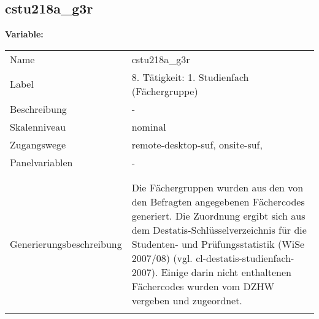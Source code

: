 	
	
	\subsection{cstu218a\_g3r}
	\label{subSection:cstu218a_g3r}

	\noindent\textbf{Variable:}\\
		\begin{tabular}{lL{11.3cm}}
			\label{tableVariable:cstu218a_g3r}
			Name & cstu218a\_g3r \\
			Label & 8. Tätigkeit: 1. Studienfach (Fächergruppe) \\
			Beschreibung & - \\
			Skalenniveau & nominal \\
			Zugangswege &
				remote-desktop-suf,
				onsite-suf,
 \\
			Panelvariablen & -
			 \\
			 \\
 \\
					Generierungsbeschreibung & Die Fächergruppen wurden aus den von den Befragten angegebenen Fächercodes generiert. Die Zuordnung ergibt sich aus dem Destatis-Schlüsselverzeichnis für die Studenten- und Prüfungsstatistik (WiSe 2007/08) (vgl. cl-destatis-studienfach-2007).  Einige darin nicht enthaltenen Fächercodes wurden vom DZHW vergeben und zugeordnet. 
				 \\	
			 \\
		\end{tabular}






